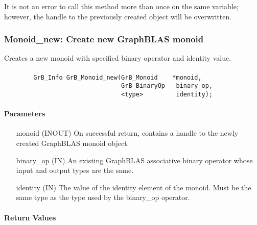 It is not an error to call this method more than once on the same variable;  
however, the handle to the previously created object will be overwritten. 


\subsubsection{{\sf Monoid\_new}: Create new GraphBLAS monoid}

Creates a new monoid with specified binary operator and identity value.

\paragraph{\syntax}

\begin{verbatim}
        GrB_Info GrB_Monoid_new(GrB_Monoid    *monoid,
                                GrB_BinaryOp   binary_op,
                                <type>         identity);
\end{verbatim}

\paragraph{Parameters}

\begin{itemize}[leftmargin=1.1in]
    \item[{\sf monoid}] ({\sf INOUT}) On successful return, contains a
                         handle to the newly created GraphBLAS monoid object.
    \item[{\sf binary\_op}] ({\sf IN}) An existing GraphBLAS associative binary 
                         operator whose input and output types are the same.
    \item[{\sf identity}]  ({\sf IN}) The value of the identity element of the 
                         monoid. Must be the same type as the type used by the
                         {\sf binary\_op} operator.
\end{itemize}

\paragraph{Return Values}

